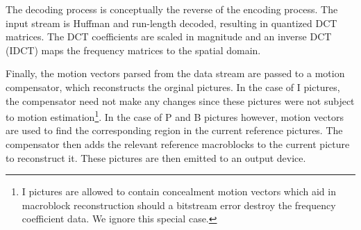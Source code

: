
The decoding process is conceptually the reverse of the encoding
process. The input stream is Huffman and run-length decoded, resulting
in quantized DCT matrices. The DCT coefficients are scaled in
magnitude and an inverse DCT (IDCT) maps the frequency matrices to the
spatial domain.

Finally, the motion vectors parsed from the data stream are passed to
a motion compensator, which reconstructs the orginal pictures. In the
case of I pictures, the compensator need not make any changes since
these pictures were not subject to motion estimation\footnote{I 
pictures are allowed to contain concealment motion vectors which aid in
macroblock reconstruction should a bitstream error destroy the 
frequency coefficient data. We ignore this special case.}. In the case of P
and B pictures however, motion vectors are used to find the
corresponding region in the current reference pictures. The
compensator then adds the relevant reference macroblocks to the
current picture to reconstruct it. These pictures are then emitted to
an output device.